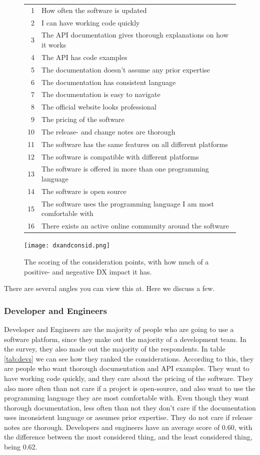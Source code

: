 \documentclass{article}
\begin{document}
\begin{figure}[H]
\centering
\begin{tabular}{r l}
\hline
1    & How often the software is updated    \\
2    & I can have working code quickly  \\
3    & The API documentation gives thorough explanations on how it works    \\
4    & The API has code examples    \\
5    & The documentation doesn't assume any prior expertise \\
6    & The documentation has consistent language    \\
7    & The documentation is easy to navigate    \\
8    & The official website looks professional  \\
9    & The pricing of the software  \\
10    &  The release- and change notes are thorough \\
11   &  The software has the same features on all different platforms   \\
12    &  The software is compatible with different platforms    \\
13  &  The software is offered in more than one programming language    \\
14    &  The software is open source    \\
15    &  The software uses the programming language I am most comfortable with  \\
16    &  There exists an active online community around the software    \\ \hline
\end{tabular}
\hspace*{-0.25\textwidth}\texttt{[image: dxandconsid.png]}
\caption{The scoring of the consideration points, with how much of a positive- and negeative DX impact it has.}
\label{fig:dxandcosnid}
\end{figure}
There are several angles you can view this at. Here we discuss a few.

\subsubsection{Developer and Engineers}
Developer and Engineers are the majority of people who are going to use a software platform, since they make out the majority of a development team. In the survey, they also made out the majority of the respondents. In table \ref{tab:devs} we can see how they ranked the considerations. According to this, they are people who want thorough documentation and API examples. They want to have working code quickly, and they care about the pricing of the software. They also more often than not care if a project is open-source, and also want to use the programming language they are most comfortable with. Even though they want thorough documentation, less often than not they don't care if the documentation uses inconsistent language or assumes prior expertise. They do not care if release notes are thorough. Developers and engineers have an average score of 0.60, with the difference between the most considered thing, and the least considered thing, being 0.62.
\end{document}
